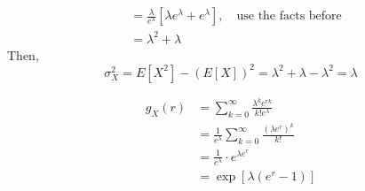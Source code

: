 \documentclass[UTF8]{article}
\begin{document}
\begin{enumerate}
\begin{equation*}
\begin{split}
                    &=\frac{\lambda}{e^\lambda}[\lambda e^\lambda+e^\lambda],\quad\text{use the facts before}\\
                    &=\lambda^2+\lambda
                \end{split}
            \end{equation*}
        Then,
        \begin{equation*}
            \sigma^2_X=E[X^2]-(E[X])^2=\lambda^2+\lambda-\lambda^2=\lambda
        \end{equation*}
        
        \begin{equation*}
            \begin{split}
                g_X(r) &=\sum^\infty_{k=0}\frac{\lambda^k e^{rk}}{k!e^\lambda}\\
                &=\frac{1}{e^\lambda}\sum^\infty_{k=0}\frac{(\lambda e^r)^k}{k!}\\
                &=\frac{1}{e^\lambda}\cdot e^{\lambda e^r}\\
                &=\exp[\lambda(e^r-1)]
            \end{split}
        \end{equation*}
    \end{enumerate}
\end{document}
